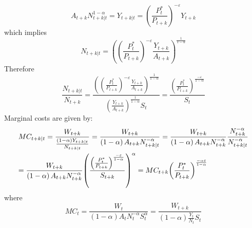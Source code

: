 \documentclass[12pt,a4paper]{article}
\begin{document}
\begin{equation}{A_{t + k}}N_{t + k|t}^{1 - \alpha } = {Y_{t + k|t}} = {\left( {\frac{{P_t^*}}{{{P_{t + k}}}}} \right)^{ - \varepsilon }}{Y_{t + k}}\end{equation}
which implies
\begin{equation}
{N_{t + k|t}} = {\left( {{{\left( {\frac{{P_t^*}}{{{P_{t + k}}}}} \right)}^{ - \varepsilon }}\frac{{{Y_{t + k}}}}{{{A_{t + k}}}}} \right)^{\frac{1}{{1 - \alpha }}}}
\end{equation}
Therefore
\begin{equation}\frac{{{N_{t + k|t}}}}{{{N_{t + k}}}} = \frac{{{{\left( {{{\left( {\frac{{P_t^*}}{{{P_{t + k}}}}} \right)}^{ - \varepsilon }}\frac{{{Y_{t + k}}}}{{{A_{t + k}}}}} \right)}^{\frac{1}{{1 - \alpha }}}}}}{{{{\left( {\frac{{{Y_{t + k}}}}{{{A_{t + k}}}}} \right)}^{\frac{1}{{1 - \alpha }}}}{S_t}}} = \frac{{{{\left( {\frac{{P_t^*}}{{{P_{t + k}}}}} \right)}^{\frac{{ - \varepsilon }}{{1 - \alpha }}}}}}{{{S_t}}}\end{equation}
Marginal costs are given by:
\[\begin{gathered}
  M{C_{t + k|t}} = \frac{{{W_{t + k}}}}{{\frac{{\left( {1 - \alpha } \right){Y_{t + k|t}}}}{{{N_{t + k|t}}}}}} = \frac{{{W_{t + k}}}}{{\left( {1 - \alpha } \right){A_{t + k}}N_{t + k|t}^{ - \alpha }}} = \frac{{{W_{t + k}}}}{{\left( {1 - \alpha } \right){A_{t + k}}N_{t + k}^{ - \alpha }}}\frac{{N_{t + k}^{ - \alpha }}}{{N_{t + k|t}^{ - \alpha }}} \hfill \\
   = \frac{{{W_{t + k}}}}{{\left( {1 - \alpha } \right){A_{t + k}}N_{t + k}^{ - \alpha }}}{\left( {\frac{{{{\left( {\frac{{P_t^*}}{{{P_{t + k}}}}} \right)}^{\frac{{ - \varepsilon }}{{1 - \alpha }}}}}}{{{S_{t + k}}}}} \right)^\alpha } = M{C_{t + k}}{\left( {\frac{{P_t^*}}{{{P_{t + k}}}}} \right)^{\frac{{ - \alpha \varepsilon }}{{1 - \alpha }}}} \hfill \\
\end{gathered} \]
where
\[
M{C_t} = \frac{{{W_t}}}{{\left( {1 - \alpha } \right){A_t}N_t^{ - \alpha }S_t^\alpha }} = \frac{{{W_{t + k}}}}{{\left( {1 - \alpha } \right)\frac{{{Y_t}}}{{{N_t}}}{S_t}}}
\]
\end{document}
